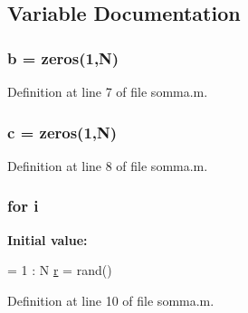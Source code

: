 \subsection{Variable Documentation}
\hypertarget{a00035_a21ad0bd836b90d08f4cf640b4c298e7c}{
\subsubsection[{b}]{\setlength{\rightskip}{0pt plus 5cm}b = zeros(1,N)}}\label{a00035_a21ad0bd836b90d08f4cf640b4c298e7c}


Definition at line 7 of file somma.\-m.

\hypertarget{a00035_ae0323a9039add2978bf5b49550572c7c}{
\subsubsection[{c}]{\setlength{\rightskip}{0pt plus 5cm}c = zeros(1,N)}}\label{a00035_ae0323a9039add2978bf5b49550572c7c}


Definition at line 8 of file somma.\-m.

\hypertarget{a00035_a6f6ccfcf58b31cb6412107d9d5281426}{
\subsubsection[{i}]{\setlength{\rightskip}{0pt plus 5cm}for i}}\label{a00035_a6f6ccfcf58b31cb6412107d9d5281426}
{\bfseries Initial value\-:}
\begin{DoxyCode}
= 1 : N
    \hyperlink{a00027_ac862e7284527eb913b1351c8bfb8e079}{r} = rand()
\end{DoxyCode}


Definition at line 10 of file somma.\-m.


